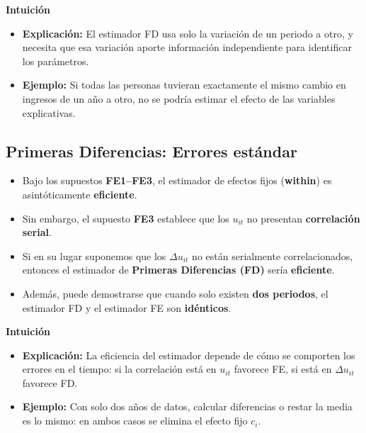\documentclass[12pt]{article}
\begin{document}
\noindent\textbf{Intuición}
\begin{itemize}
    \item \textbf{Explicación:} El estimador FD usa solo la variación de un periodo a otro, y necesita que esa variación aporte información independiente para identificar los parámetros.
    \item \textbf{Ejemplo:} Si todas las personas tuvieran exactamente el mismo cambio en ingresos de un año a otro, no se podría estimar el efecto de las variables explicativas.
\end{itemize}

\subsection*{\noindent\textbf{Primeras Diferencias: Errores estándar}}

\begin{itemize}
    \item Bajo los supuestos \textbf{FE1–FE3}, el estimador de efectos fijos (\textbf{within}) es asintóticamente \textbf{eficiente}.
    
    \item Sin embargo, el supuesto \textbf{FE3} establece que los $u_{it}$ no presentan \textbf{correlación serial}.
    
    \item Si en su lugar suponemos que los $\Delta u_{it}$ no están serialmente correlacionados, entonces el estimador de \textbf{Primeras Diferencias (FD)} sería \textbf{eficiente}.
    
    \item Además, puede demostrarse que cuando solo existen \textbf{dos periodos}, el estimador FD y el estimador FE son \textbf{idénticos}.
\end{itemize}

\noindent\textbf{Intuición}
\begin{itemize}
    \item \textbf{Explicación:} La eficiencia del estimador depende de cómo se comporten los errores en el tiempo: si la correlación está en $u_{it}$ favorece FE, si está en $\Delta u_{it}$ favorece FD.
    \item \textbf{Ejemplo:} Con solo dos años de datos, calcular diferencias o restar la media es lo mismo: en ambos casos se elimina el efecto fijo $c_i$.
\end{itemize}
\end{document}
